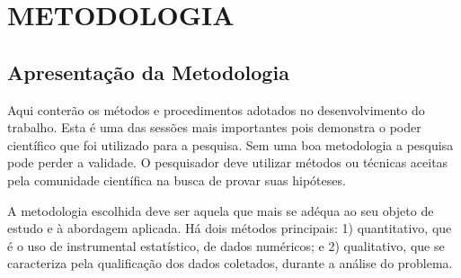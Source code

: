 \chapter{METODOLOGIA}
\section{Apresentação da Metodologia}
Aqui conterão os métodos e procedimentos adotados no desenvolvimento do trabalho. Esta é uma das sessões mais importantes pois demonstra o poder científico que foi utilizado para a pesquisa. Sem uma boa metodologia a pesquisa pode perder a validade. O pesquisador deve utilizar métodos ou técnicas aceitas pela comunidade científica na busca de provar suas hipóteses.

A metodologia escolhida deve ser aquela que mais se adéqua ao seu objeto de estudo e à abordagem aplicada. Há dois métodos principais: 1) quantitativo, que é o uso de instrumental estatístico, de dados numéricos; e 2) qualitativo, que se caracteriza pela qualificação dos dados coletados, durante a análise do problema.

